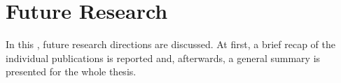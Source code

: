 
\chapter{Future Research}
\label{chap:future-research}

In this , future research directions are discussed.
At first, a brief recap of the individual publications is reported and, afterwards, a general summary is presented for the whole thesis.

